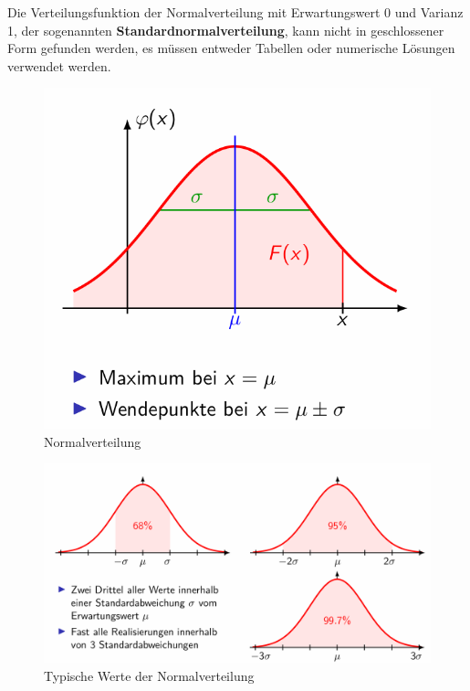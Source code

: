 \documentclass[../Main.tex]{subfiles}
\begin{document}
Die Verteilungsfunktion der Normalverteilung mit Erwartungswert 0 und Varianz 1,
der sogenannten \textbf{Standardnormalverteilung}, kann nicht in geschlossener Form gefunden werden,
es müssen entweder Tabellen oder numerische  Lösungen verwendet werden.


\begin{figure}[H]
    \centering
    \includegraphics[width=0.5\linewidth]{Images/normalverteilung.png}
    \caption{Normalverteilung}
\end{figure}


\begin{figure}[H]
    \centering
    \includegraphics[width=0.75\linewidth]{Images/norm-typische-werte.png}
    \caption{Typische Werte der Normalverteilung}
\end{figure}
\end{document}
